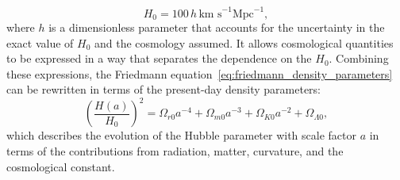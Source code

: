 \begin{equation}
    H_0 = 100 \, h \, \text{km s}^{-1} \text{Mpc}^{-1},
    \label{eq:hubble_parameter_current}
\end{equation}
where \( h \) is a dimensionless parameter that accounts for the uncertainty in the exact value of \( H_0 \) and the cosmology assumed. It allows cosmological quantities to be expressed in a way that separates the dependence on the $H_0$.
Combining these expressions, the Friedmann equation~\eqref{eq:friedmann_density_parameters} can be rewritten in terms of the present-day density parameters:
\begin{equation}
    \left( \frac{H(a)}{H_0} \right)^2 = \Omega_{r0} a^{-4} + \Omega_{m0} a^{-3} + \Omega_{K0} a^{-2} + \Omega_{\Lambda0},
    \label{eq:friedmann_rewritten}
\end{equation}
which describes the evolution of the Hubble parameter with scale factor \( a \) in terms of the contributions from radiation, matter, curvature, and the cosmological constant.


